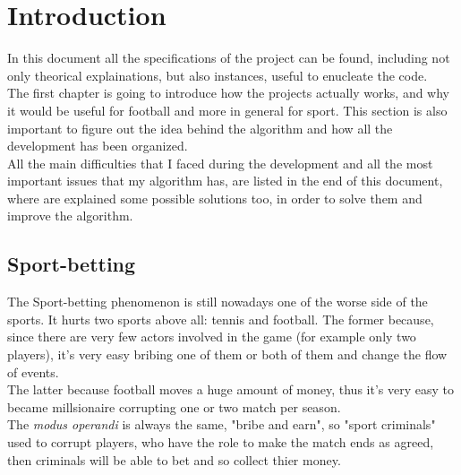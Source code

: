 \documentclass[a4paper,titlepage,11pt]{report}
\begin{document}
{\selectfont
\begin{frontespizio}
\Titolo{\textcolor{black}{Football-betting Detection System}}
\Rientro{2.5cm}
\end{frontespizio}



\pagebreak



\tableofcontents



\chapter{
Introduction}
In this document all the specifications of the project can be found, including not only theorical explainations, but also instances, useful to enucleate the code.\\
The first chapter is going to introduce how the projects actually works, and why it would be useful for football and more in general for sport. This section is also important to figure out the idea behind the algorithm and how all the development has been organized.\\
All the main difficulties that I faced during the development and all the most important issues that my algorithm has, are listed in the end of this document, where are explained some possible solutions too, in order to solve them and improve the algorithm.

\section{
Sport-betting}
The Sport-betting phenomenon is still nowadays one of the worse side of the sports. It hurts two sports above all: tennis and football. The former because, since there are very few actors involved in the game (for example only two players), it's very easy bribing one of them or both of them and change the flow of events.\\
The latter because football moves a huge amount of money, thus it's very easy to became millsionaire corrupting one or two match per season.\\
The \textit{modus operandi} is always the same, "bribe and earn", so "sport criminals" used to corrupt players, who have the role to make the match ends as agreed, then criminals will be able to bet and so collect thier money.


}
\end{document}
